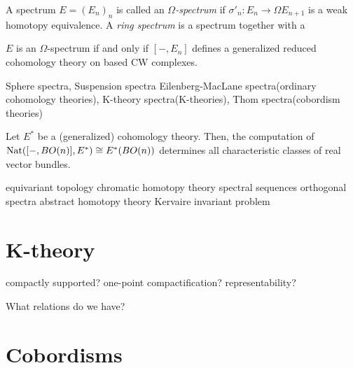 \documentclass{../../large}
\begin{document}
\begin{prb}
A spectrum $E=(E_n)_n$ is called an \emph{$\Omega$-spectrum} if $\sigma'_n:E_n\to\Omega E_{n+1}$ is a weak homotopy equivalence.
A \emph{ring spectrum} is a spectrum together with a 
\begin{parts}
\item $E$ is an $\Omega$-spectrum if and only if $[-,E_n]$ defines a generalized reduced cohomology theory on based CW complexes.
\end{parts}
\end{prb}




Sphere spectra, Suspension spectra
Eilenberg-MacLane spectra(ordinary cohomology theories), K-theory spectra(K-theories), Thom spectra(cobordism theories)



Let $E^*$ be a (generalized) cohomology theory.
Then, the computation of $\operatorname{Nat}([-,BO(n)],E^*)\cong E^*(BO(n))$ determines all characteristic classes of real vector bundles.




equivariant topology
chromatic homotopy theory
spectral sequences
orthogonal spectra
abstract homotopy theory
Kervaire invariant problem






\chapter{K-theory}


\begin{prb}
compactly supported?
one-point compactification?
representability?

What relations do we have?
\end{prb}

\chapter{Cobordisms}
\end{document}
